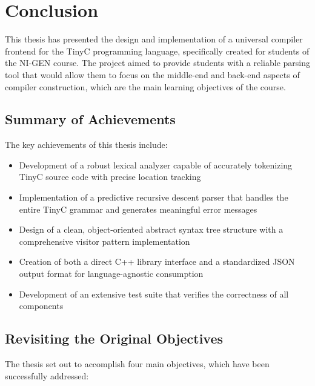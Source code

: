 \chapter{Conclusion}

This thesis has presented the design and implementation of a universal compiler frontend for the TinyC programming language, specifically created for students of the NI-GEN course. The project aimed to provide students with a reliable parsing tool that would allow them to focus on the middle-end and back-end aspects of compiler construction, which are the main learning objectives of the course.

\section{Summary of Achievements}

The key achievements of this thesis include:

\begin{itemize}
    \item Development of a robust lexical analyzer capable of accurately tokenizing TinyC source code with precise location tracking
    \item Implementation of a predictive recursive descent parser that handles the entire TinyC grammar and generates meaningful error messages
    \item Design of a clean, object-oriented abstract syntax tree structure with a comprehensive visitor pattern implementation
    \item Creation of both a direct C++ library interface and a standardized JSON output format for language-agnostic consumption
    \item Development of an extensive test suite that verifies the correctness of all components
\end{itemize}

\section{Revisiting the Original Objectives}

The thesis set out to accomplish four main objectives, which have been successfully addressed:

